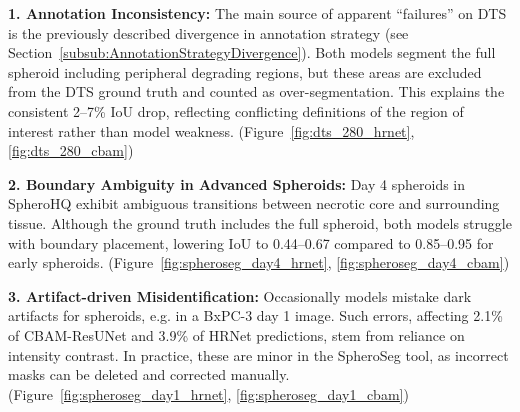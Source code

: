 \documentclass[preprint,12pt]{elsarticle}
\newcommand{\app}{SpheroSeg}
\newcommand{\dsHQ}{SpheroHQ}
\newcommand{\dsDTS}{DTS}
\begin{document}
\textbf{1. Annotation Inconsistency:} 
The main source of apparent “failures” on \dsDTS{} is the previously described divergence in annotation strategy (see Section~\ref{subsub:AnnotationStrategyDivergence}). Both models segment the full spheroid including peripheral degrading regions, but these areas are excluded from the \dsDTS{} ground truth and counted as over-segmentation. This explains the consistent 2–7\% IoU drop, reflecting conflicting definitions of the region of interest rather than model weakness. (Figure~\ref{fig:dts_280_hrnet}, \ref{fig:dts_280_cbam})

\textbf{2. Boundary Ambiguity in Advanced Spheroids:}
Day 4 spheroids in \dsHQ{} exhibit ambiguous transitions between necrotic core and surrounding tissue. Although the ground truth includes the full spheroid, both models struggle with boundary placement, lowering IoU to 0.44–0.67 compared to 0.85–0.95 for early spheroids. (Figure~\ref{fig:spheroseg_day4_hrnet}, \ref{fig:spheroseg_day4_cbam})

\textbf{3. Artifact-driven Misidentification:}
Occasionally models mistake dark artifacts for spheroids, e.g. in a BxPC-3 day 1 image. Such errors, affecting 2.1\% of CBAM-ResUNet and 3.9\% of HRNet predictions, stem from reliance on intensity contrast. In practice, these are minor in the \app{} tool, as incorrect masks can be deleted and corrected manually. (Figure~\ref{fig:spheroseg_day1_hrnet}, \ref{fig:spheroseg_day1_cbam})
\end{document}
